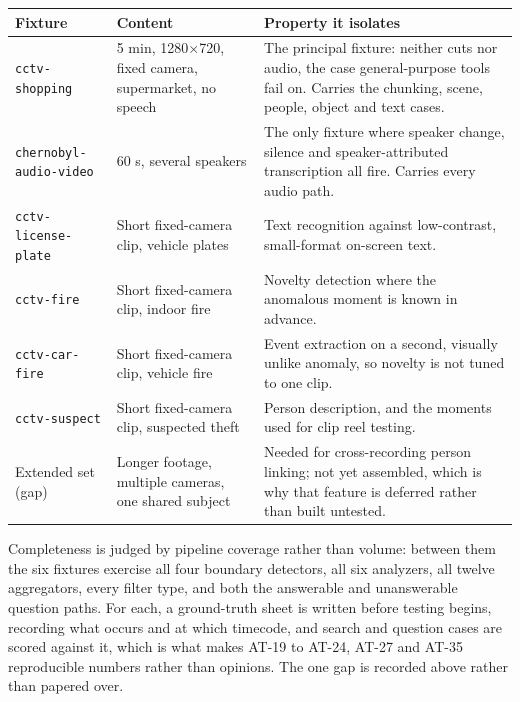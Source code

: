 \documentclass[11pt,a4paper]{article}
\begin{document}
\begin{center}
\centering
\footnotesize
\begin{tabularx}{\textwidth}{@{}L{3.0cm}L{2.9cm}X@{}}
\toprule
\textbf{Fixture} & \textbf{Content} & \textbf{Property it isolates} \\
\midrule
\texttt{cctv-shopping} & 5 min, 1280$\times$720, fixed camera, supermarket, no speech &
The principal fixture: neither cuts nor audio, the case general-purpose tools fail on.
Carries the chunking, scene, people, object and text cases. \\
\texttt{chernobyl-\allowbreak audio-video} & 60 s, several speakers &
The only fixture where speaker change, silence and speaker-attributed transcription all
fire. Carries every audio path. \\
\texttt{cctv-license-plate} & Short fixed-camera clip, vehicle plates &
Text recognition against low-contrast, small-format on-screen text. \\
\texttt{cctv-fire} & Short fixed-camera clip, indoor fire &
Novelty detection where the anomalous moment is known in advance. \\
\texttt{cctv-car-fire} & Short fixed-camera clip, vehicle fire &
Event extraction on a second, visually unlike anomaly, so novelty is not tuned to one clip. \\
\texttt{cctv-suspect} & Short fixed-camera clip, suspected theft &
Person description, and the moments used for clip reel testing. \\
\addlinespace[2pt]
Extended set (gap) & Longer footage, multiple cameras, one shared subject &
Needed for cross-recording person linking; not yet assembled, which is why that feature is
deferred rather than built untested. \\
\bottomrule
\end{tabularx}
\end{center}

Completeness is judged by pipeline coverage rather than volume: between them the six
fixtures exercise all four boundary detectors, all six analyzers, all twelve aggregators,
every filter type, and both the answerable and unanswerable question paths. For each, a
ground-truth sheet is written before testing begins, recording what occurs and at which
timecode, and search and question cases are scored against it, which is what makes
AT-19 to AT-24, AT-27 and AT-35 reproducible numbers rather than opinions. The one gap is
recorded above rather than papered over.

\end{document}
